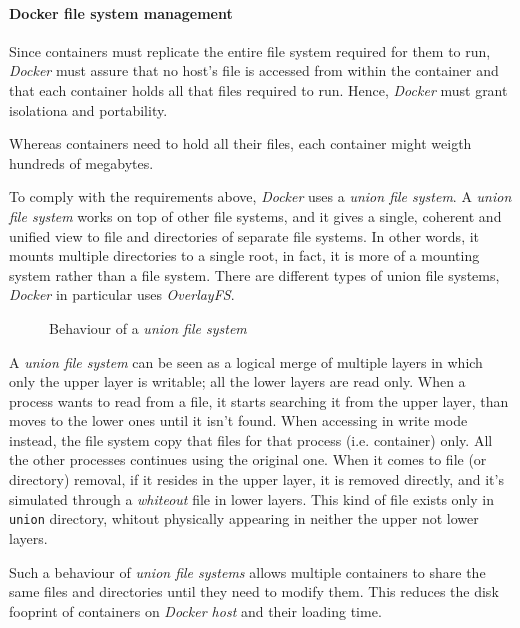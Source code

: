 \paragraph{Docker file system management}
Since containers must replicate the entire file system required for them to
run, \emph{Docker} must assure that no host's file is accessed from within the
container and that each container holds all that files required to run.
Hence, \emph{Docker} must grant isolationa and portability.

\begin{note}
    Whereas containers need to hold all their files, each container might
    weigth hundreds of megabytes.
\end{note}

\noindent
To comply with the requirements above, \emph{Docker} uses a \emph{union file
system}. A \emph{union file system} works on top of other file systems, and
it gives a single, coherent and unified view to file and directories of
separate file systems. In other words, it mounts multiple directories to a
single root, in fact, it is more of a mounting system rather than a file
system. There are different types of union file systems, \emph{Docker} in
particular uses \emph{OverlayFS}.

\begin{figure}[h!]
    \centering
    \caption{Behaviour of a \emph{union file system}}
\end{figure}

\noindent
A \emph{union file system} can be seen as a logical merge of multiple layers in
which only the upper layer is writable; all the lower layers are read only.
When a process wants to read from a file, it starts searching it from the
upper layer, than moves to the lower ones until it isn't found. When accessing
in write mode instead, the file system copy that files for that process (i.e.
container) only. All the other processes continues using the original one.
When it comes to file (or directory) removal, if it resides in the upper layer,
it is removed directly, and it's simulated through a \emph{whiteout} file in
lower layers. This kind of file exists only in \texttt{union} directory, whitout
physically appearing in neither the upper not lower layers.

Such a behaviour of \emph{union file systems} allows multiple containers to
share the same files and directories until they need to modify them. This
reduces the disk fooprint of containers on \emph{Docker host} and their loading
time.

